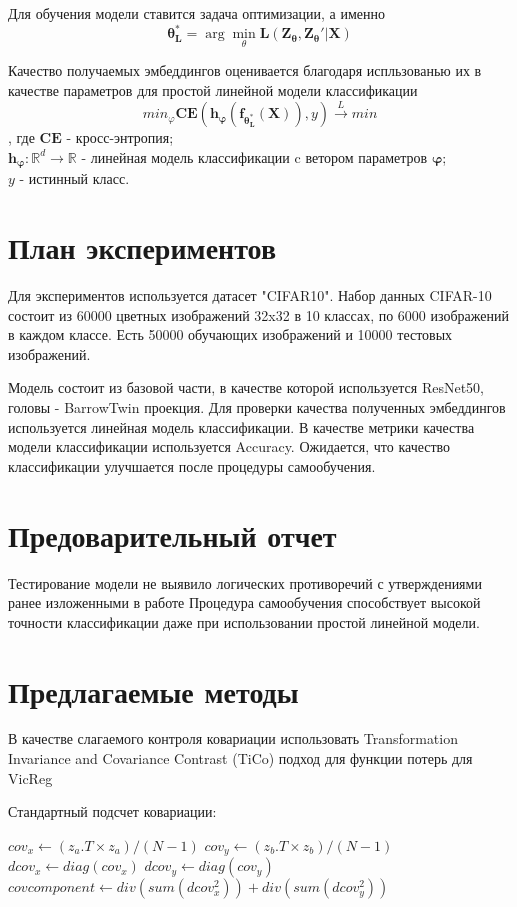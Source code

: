 \documentclass{article}
\begin{document}
Для обучения модели ставится задача оптимизации, а именно 
$$\bm{\theta_{L}^*} = \arg \min_{\theta}{\bm{L}(\bm{Z_{\theta}}, \bm{Z_{\theta}'}| \bm{X})}$$

Качество получаемых эмбеддингов оценивается благодаря испльзованью их в качестве параметров для простой линейной модели классификации 
$$min_{\varphi} \bm{CE}(\bm{h_{\varphi}} (\bm{f_{\theta_{L}^*}(\bm{X})}), y) \xrightarrow{L} min$$, где $\bm{CE}$ - кросс-энтропия; \\$\bm{h_{\varphi}} : \mathbb{R}^d \rightarrow \mathbb{R}$ - линейная модель классификации c ветором параметров $\bm{\varphi}$;\\ $y$ - истинный класс.



\section{План экспериментов}
Для экспериментов используется датасет "CIFAR10". Набор данных CIFAR-10 состоит из 60000 цветных изображений 32x32 в 10 классах, по 6000 изображений в каждом классе. Есть 50000 обучающих изображений и 10000 тестовых изображений.




Модель состоит из базовой части, в качестве которой используется ResNet50, головы - BarrowTwin проекция. Для проверки качества полученных эмбеддингов используется линейная модель классификации. В качестве метрики качества модели классификации используется Accuracy. Ожидается, что качество классификации улучшается после процедуры самообучения.


\section{Предоварительный отчет}
Тестирование модели не выявило логических противоречий с утверждениями ранее изложенными в работе
Процедура самообучения способствует высокой точности классификации даже при использовании простой линейной модели.


\section{Предлагаемые методы}
В качестве слагаемого контроля ковариации использовать  Transformation Invariance and Covariance Contrast (TiCo) подход для функции потерь для VicReg

Стандартный подсчет ковариации:
\begin{algorithm}
$cov_x \gets (z_a.T \times z_a) / (N - 1)$\;
$cov_y \gets (z_b.T \times z_b) / (N - 1)$\;
$dcov_x \gets diag(cov_x)$\;
$dcov_y \gets diag(cov_y)$\;
$covcomponent \gets div(sum(dcov_x^2)) + div(sum(dcov_y^2))$
\end{algorithm}
\end{document}

